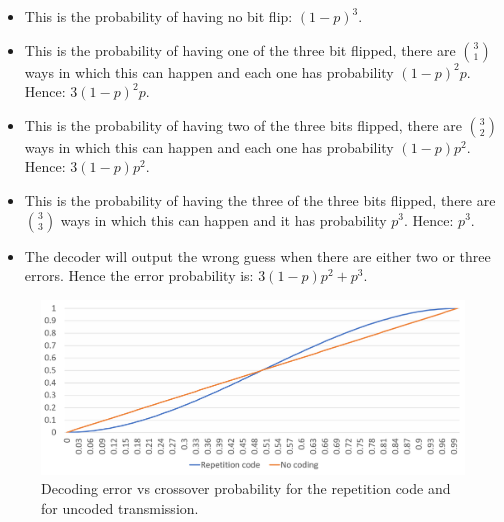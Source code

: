 \begin{solution}
\begin{itemize}
\item This is the probability of having no bit flip: $(1-p)^3$.
\item This is the probability of having one of the three bit flipped, there are $3\choose 1$ ways in which this can happen and each one has probability $(1-p)^2p$. Hence: $3(1-p)^2p$.
\item This is the probability of having two of the three bits flipped, there are $3\choose 2$ ways in which this can happen and each one has probability $(1-p)p^2$. Hence: $3(1-p)p^2$.
\item This is the probability of having the three of the three bits flipped, there are $3\choose 3$ ways in which this can happen and it has probability $p^3$. Hence: $p^3$.
\item The decoder will output the wrong guess when there are either two or three errors. Hence the error probability is: $3(1-p)p^2+p^3$.
\end{itemize}
\begin{figure}[h!]
\begin{center}
\def\svgwidth{\columnwidth} 
\includegraphics[width=\linewidth]{figures/bscrepcode.png} 
\caption{Decoding error vs crossover probability for the repetition code and for uncoded transmission.}
\label{fig:bscrep}
\end{center}
\end{figure}
\end{solution}
